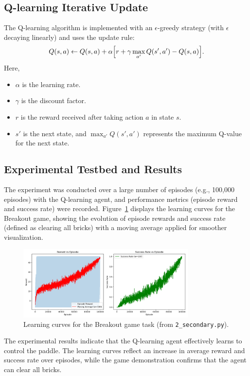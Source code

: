 \documentclass{article}
\begin{document}
\subsection{Q-learning Iterative Update}
The Q-learning algorithm is implemented with an $\epsilon$-greedy strategy (with $\epsilon$ decaying linearly) and uses the update rule:
\[
Q(s,a) \leftarrow Q(s,a) + \alpha \Bigl[r + \gamma \max_{a'} Q(s',a') - Q(s,a)\Bigr].
\]
Here,
\begin{itemize}
    \item $\alpha$ is the learning rate.
    \item $\gamma$ is the discount factor.
    \item $r$ is the reward received after taking action $a$ in state $s$.
    \item $s'$ is the next state, and $\max_{a'} Q(s',a')$ represents the maximum Q-value for the next state.
\end{itemize}

\subsection{Experimental Testbed and Results}
The experiment was conducted over a large number of episodes (e.g., 100,000 episodes) with the Q-learning agent, and performance metrics (episode reward and success rate) were recorded. Figure~\ref{fig:figure2} displays the learning curves for the Breakout game, showing the evolution of episode rewards and success rate (defined as clearing all bricks) with a moving average applied for smoother visualization.

\begin{figure}[H]
    \centering
    \includegraphics[width=0.8\textwidth]{Figure_2.png}
    \caption{Learning curves for the Breakout game task (from \texttt{2\_secondary.py}).}
    \label{fig:figure2}
\end{figure}

The experimental results indicate that the Q-learning agent effectively learns to control the paddle. The learning curves reflect an increase in average reward and success rate over episodes, while the game demonstration confirms that the agent can clear all bricks.
\end{document}
